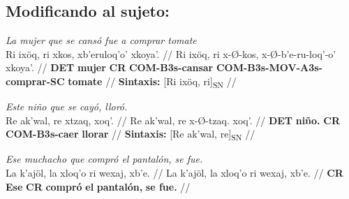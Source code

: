 \documentclass{article}%
\begin{document}
\subsection{Modificando al sujeto:}%
\label{subsec:Modificandoalsujeto}%

%
\par\medskip%
\ex
\textit{La mujer que se cansó fue a comprar tomate} \\
\begingl
\gla Ri ixöq, ri xkos, xb'eruloq'o' xkoya'. //
\glb Ri ixöq, ri x-Ø-kos, x-Ø-b'e-ru-loq'-o' xkoya'. //
\glc \textbf{DET} \textbf{mujer} \textbf{CR} \textbf{COM-}\textbf{B3s-}\textbf{cansar} \textbf{COM-}\textbf{B3s-}\textbf{MOV-}\textbf{A3s-}\textbf{comprar-}\textbf{SC} \textbf{tomate} //
\glft \textbf{Sintaxis:} [Ri ixöq, ri]\textsubscript{SN} //
\endgl
\xe
%
\medskip%
\par\medskip%
\ex
\textit{Este niño que se cayó, lloró.} \\
\begingl
\gla Re ak'wal, re xtzaq, xoq'. //
\glb Re ak'wal, re x-Ø-tzaq. xoq'. //
\glc \textbf{DET} \textbf{niño.} \textbf{CR} \textbf{COM-}\textbf{B3s-}\textbf{caer} \textbf{llorar} //
\glft \textbf{Sintaxis:} [Re ak'wal, re]\textsubscript{SN} //
\endgl
\xe
%
\medskip%
\par\medskip%
\ex
\textit{Ese muchacho que compró el pantalón, se fue.} \\
\begingl
\gla La k'ajöl, la xloq'o ri wexaj, xb'e. //
\glb La k'ajöl, la xloq'o ri wexaj, xb'e. //
\glc \textbf{CR} \textbf{Ese} \textbf{CR} \textbf{compró} \textbf{el} \textbf{pantalón,} \textbf{se fue.} //
\endgl
\xe
%
\medskip

%
\end{document}
